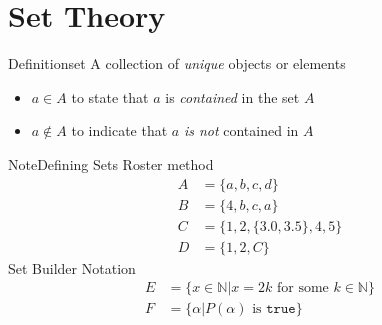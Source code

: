 \documentclass{MathNotes}
\newenvironment{definition}[1]{\begin{RedBox}{Definition}{#1}}{\end{RedBox}}
\newenvironment{note}[1]{\begin{YellowBox}{Note}{#1}}{\end{YellowBox}}
\begin{document}
\section{Set Theory}
\begin{multicols}{2}
	\begin{definition}{set}\label{def:set}
		A collection of \textit{unique} objects or elements
		\begin{itemize}
			\item $a\in A$ to state that $a$ is \textit{contained} in the set $A$
			\item $a\not\in A$ to indicate that $a$ \textit{is not} contained in $A$
		\end{itemize}
	\end{definition}

	\begin{note}{Defining Sets}\label{note:defining-sets}
		Roster method
		\begin{align*}
			A & = \{a,b,c,d\}                            \\
			B & = \{4,b,c,a\}                            \\
			C & = \bigl\{1, 2, \{3.0, 3.5\}, 4, 5\bigr\} \\
			D & = \{1, 2, C\}
		\end{align*}
		Set Builder Notation
		\begin{align*}
			E & = \{x\in\mathbb{N} \big| x=2k\text{ for some }k\in\mathbb{N}\} \\
			F & = \{\alpha \big| P(\alpha) \text{ is }\texttt{true}\}
		\end{align*}
	\end{note}
\end{multicols}
\end{document}
